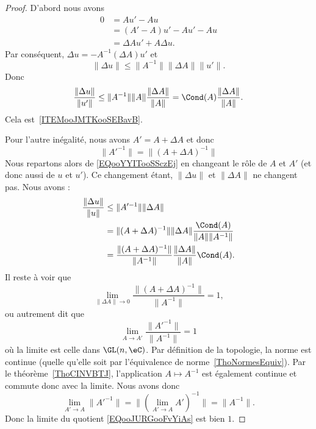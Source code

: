 \begin{proof}
    D'abord nous avons
    \begin{subequations}
        \begin{align}
            0&=Au'-Au\\
            &=(A'-A)u'-Au'-Au\\
            &=\Delta Au'+A\Delta u.
        \end{align}
    \end{subequations}
    Par conséquent, \( \Delta u=-A^{-1}(\Delta A)u'\) et
    \begin{equation}        \label{EQooYYITooSSczEj}
        \| \Delta u \|\leq \| A^{-1} \|\| \Delta A \|\| u' \|.
    \end{equation}
    Donc
    \begin{equation}
        \frac{ \| \Delta u \| }{ \| u' \| }\leq   \| A^{-1} \|\| A \|\frac{ \| \Delta A \| }{ \| A \| }   =\Cond(A)\frac{ \| \Delta A \| }{ \| A \| }.
    \end{equation}
    Cela est~\ref{ITEMooJMTKooSEBavB}.

    Pour l'autre inégalité, nous avons \( A'=A+\Delta A\) et donc
    \begin{equation}
        \| A'^{-1} \|=\| (A+\Delta A)^{-1} \|
    \end{equation}
    Nous repartons alors de \eqref{EQooYYITooSSczEj} en changeant le rôle de \( A\) et \( A'\) (et donc aussi de \( u\) et \( u'\)). Ce changement étant, \( \| \Delta u \|\) et \( \| \Delta A \|\) ne changent pas. Nous avons :
    \begin{subequations}
        \begin{align}
            \frac{ \| \Delta u \| }{ \| u \| }&\leq \| A'^{-1} \|\| \Delta A \|\\
            &=\| (A+\Delta A)^{-1} \|\| \Delta A \|\frac{ \Cond(A) }{ \| A \|\| A^{-1} \| }\\
            &=\frac{ \| (A+\Delta A)^{-1} \| }{ \| A^{-1} \| }\frac{ \| \Delta A \| }{ \| A \| }\Cond(A).
        \end{align}
    \end{subequations}
    Il reste à voir que
    \begin{equation}
        \lim_{\| \Delta A \|\to 0} \frac{ \| (A+\Delta A)^{-1} \| }{ \| A^{-1} \| }=1,
    \end{equation}
    ou autrement dit que
    \begin{equation}        \label{EQooJURGooFvYiAs}
        \lim_{A\to A'} \frac{ \| A'^{-1} \| }{ \| A^{-1} \| }=1
    \end{equation}
    où la limite est celle dans \( \GL(n,\eC)\). Par définition de la topologie, la norme est continue (quelle qu'elle soit par l'équivalence de norme~\ref{ThoNormesEquiv}). Par le théorème~\ref{ThoCINVBTJ}, l'application \( A\mapsto A^{-1}\) est également continue et commute donc avec la limite. Nous avons donc
    \begin{equation}
        \lim_{A'\to A}\| A'^{-1} \|=\| (\lim_{A'\to A} A')^{-1} \|=\| A^{-1} \|.
    \end{equation}
    Donc la limite du quotient \eqref{EQooJURGooFvYiAs} est bien \( 1\).
\end{proof}

